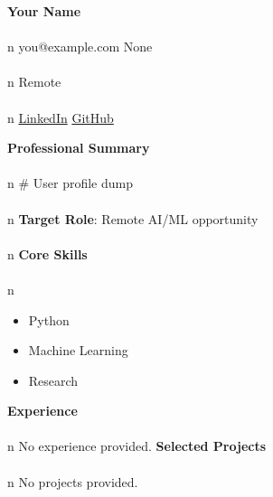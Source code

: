 \documentclass[11pt]{article}
\begin{document}
\begin{center}
{\Large \textbf{Your Name}}\\\\n
you@example.com None\\\\n
Remote\\\\n
\href{https://www.linkedin.com}{LinkedIn} \quad \href{https://github.com}{GitHub}
\end{center}
\vspace{0.2cm}
\noindent\textbf{Professional Summary}\\\\n
# User profile dump\\\\n
\vspace{0.2cm}
\noindent\textbf{Target Role}: Remote AI/ML opportunity\\\\n
\vspace{0.2cm}
\noindent\textbf{Core Skills}\\\\n
\begin{itemize}[leftmargin=*]
\item {Python}
\item {Machine Learning}
\item {Research}
\end{itemize}
\vspace{0.2cm}
\noindent\textbf{Experience}\\\\n
No experience provided.
\vspace{0.2cm}
\noindent\textbf{Selected Projects}\\\\n
No projects provided.
\end{document}
